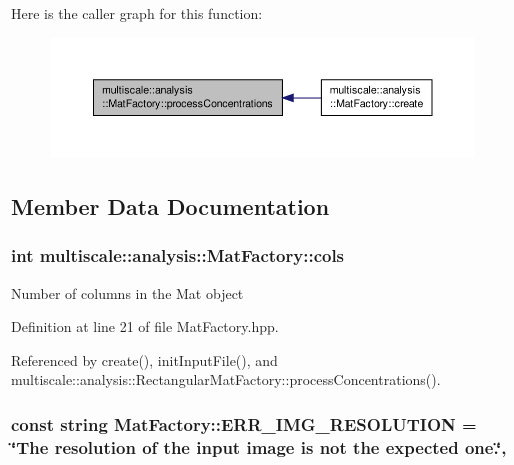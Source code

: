 Here is the caller graph for this function\-:\nopagebreak
\begin{figure}[H]
\begin{center}
\leavevmode
\includegraphics[width=350pt]{classmultiscale_1_1analysis_1_1MatFactory_a0493c87d7b74619a95f14c0e31a3e178_icgraph}
\end{center}
\end{figure}




\subsection{Member Data Documentation}
\hypertarget{classmultiscale_1_1analysis_1_1MatFactory_a9514356fe5226eaa31a4e61ca62a027c}{
\subsubsection[{cols}]{\setlength{\rightskip}{0pt plus 5cm}int multiscale\-::analysis\-::\-Mat\-Factory\-::cols\hspace{0.3cm}{\ttfamily [protected]}}}\label{classmultiscale_1_1analysis_1_1MatFactory_a9514356fe5226eaa31a4e61ca62a027c}
Number of columns in the Mat object 

Definition at line 21 of file Mat\-Factory.\-hpp.



Referenced by create(), init\-Input\-File(), and multiscale\-::analysis\-::\-Rectangular\-Mat\-Factory\-::process\-Concentrations().

\hypertarget{classmultiscale_1_1analysis_1_1MatFactory_ab5e9403dc7f8465189d444f909d473e7}{
\subsubsection[{E\-R\-R\-\_\-\-I\-M\-G\-\_\-\-R\-E\-S\-O\-L\-U\-T\-I\-O\-N}]{\setlength{\rightskip}{0pt plus 5cm}const string Mat\-Factory\-::\-E\-R\-R\-\_\-\-I\-M\-G\-\_\-\-R\-E\-S\-O\-L\-U\-T\-I\-O\-N = \char`\"{}The resolution of the input image is not the expected one.\char`\"{}\hspace{0.3cm}{\ttfamily [static]}, {\ttfamily [protected]}}}\label{classmultiscale_1_1analysis_1_1MatFactory_ab5e9403dc7f8465189d444f909d473e7}


